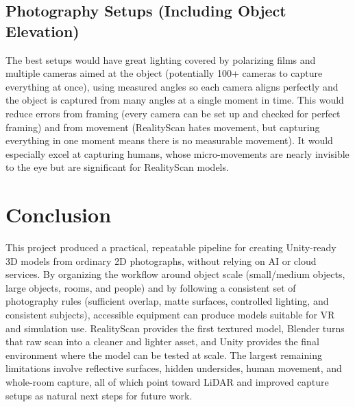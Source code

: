 \documentclass[11pt]{article}
\begin{document}
\subsection{Photography Setups (Including Object Elevation)}
The best setups would have great lighting covered by polarizing films and multiple cameras aimed at the object (potentially 100+ cameras to capture everything at once), using measured angles so each camera aligns perfectly and the object is captured from many angles at a single moment in time. This would reduce errors from framing (every camera can be set up and checked for perfect framing) and from movement (RealityScan hates movement, but capturing everything in one moment means there is no measurable movement). It would especially excel at capturing humans, whose micro-movements are nearly invisible to the eye but are significant for RealityScan models.

\section{Conclusion}
\noindent This project produced a practical, repeatable pipeline for creating Unity-ready 3D models from ordinary 2D photographs, without relying on AI or cloud services. By organizing the workflow around object scale (small/medium objects, large objects, rooms, and people) and by following a consistent set of photography rules (sufficient overlap, matte surfaces, controlled lighting, and consistent subjects), accessible equipment can produce models suitable for VR and simulation use. RealityScan provides the first textured model, Blender turns that raw scan into a cleaner and lighter asset, and Unity provides the final environment where the model can be tested at scale. The largest remaining limitations involve reflective surfaces, hidden undersides, human movement, and whole-room capture, all of which point toward LiDAR and improved capture setups as natural next steps for future work.
\end{document}
